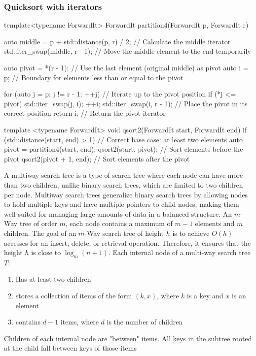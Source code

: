 \documentclass{report}
\begin{document}
\subsubsection{Quicksort with iterators}
\bigbreak \noindent 
\begin{cppcode}
    template<typename ForwardIt>
    ForwardIt partition4(ForwardIt p, ForwardIt r) {
        auto middle = p + std::distance(p, r) / 2; // Calculate the middle iterator
        std::iter_swap(middle, r - 1);   // Move the middle element to the end temporarily

        auto pivot = *(r - 1); // Use the last element (original middle) as pivot
        auto i = p; // Boundary for elements less than or equal to the pivot

        for (auto j = p; j != r - 1; ++j) { // Iterate up to the pivot position
            if (*j <= pivot) {
                std::iter_swap(j, i);
                ++i;
            }
        }
        std::iter_swap(i, r - 1); // Place the pivot in its correct position
        return i; // Return the pivot iterator
    }

    template <typename ForwardIt>
    void qsort2(ForwardIt start, ForwardIt end) {
        if (std::distance(start, end) > 1) { // Correct base case: at least two elements
            auto pivot = partition4(start, end);
            qsort2(start, pivot); // Sort elements before the pivot
            qsort2(pivot + 1, end); // Sort elements after the pivot
        }
    }
\end{cppcode}





\pagebreak 
{}
\bigbreak \noindent 
A multiway search tree is a type of search tree where each node can have more than two children, unlike binary search trees, which are limited to two children per node. Multiway search trees generalize binary search trees by allowing nodes to hold multiple keys and have multiple pointers to child nodes, making them well-suited for managing large amounts of data in a balanced structure.
\bigbreak \noindent 
An $m$-Way tree of order $m$, each node contains a maximum of $m - 1$ elements and $m$ children.
\bigbreak \noindent 
The goal of an $m$-Way search tree of height $h$ is to achieve $O(h)$ accesses for an insert, delete, or retrieval operation. Therefore, it ensures that the height $h$ is close to $\log_m(n + 1)$.
\bigbreak \noindent 
Each internal node of a multi-way search tree $T$:
\begin{enumerate}
    \item Has at least two children
    \item stores a collection of items of the form $(k, x)$, where $k$ is a key and $x$ is an element
    \item contains $d - 1$ items, where $d$ is the number of children
\end{enumerate}
\bigbreak \noindent 
Children of each internal node are "between" items. All keys in the subtree rooted at the child fall between keys of those items
\bigbreak \noindent 
{}
\bigbreak \noindent 
\end{document}
